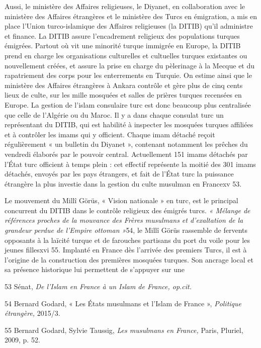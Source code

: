 Aussi, le ministère des Affaires religieuses, le Diyanet, en
collaboration avec le ministère des Affaires étrangères et le ministère
des Turcs en émigration, a mis en place l'Union turco-islamique des
Affaires religieuses (la DITIB) qu'il administre et finance. La DITIB
assure l'encadrement religieux des populations turques émigrées. Partout
où vit une minorité turque immigrée en Europe, la DITIB prend en charge
les organisations culturelles et cultuelles turques existantes ou
nouvellement créées, et assure la prise en charge du pèlerinage à la
Mecque et du rapatriement des corps pour les enterrements en Turquie. On
estime ainsi que le ministère des Affaires étrangères à Ankara contrôle
et gère plus de cinq cents lieux de culte, sur les mille mosquées et
salles de prières turques recensées en Europe. La gestion de l'islam
consulaire turc est donc beaucoup plus centralisée que celle de
l'Algérie ou du Maroc. Il y a dans chaque consulat turc un représentant
du DITIB, qui est habilité à inspecter les mosquées turques affiliées et
à contrôler les imams qui y officient. Chaque imam détaché reçoit
régulièrement « un bulletin du Diyanet », contenant notamment les
prêches du vendredi élaborés par le pouvoir central. Actuellement 151
imams détachés par l'État turc officient à temps plein : cet effectif
représente la moitié des 301 imams détachés, envoyés par les pays
étrangers, et fait de l'État turc la puissance étrangère la plus
investie dans la gestion du culte musulman en Francexv 53.

Le mouvement du Millî Görüs, « Vision nationale » en turc, est le
principal concurrent du DITIB dans le contrôle religieux des émigrés
turcs. \emph{« Mélange de références proches de la mouvance des Frères
musulmans et d'exaltation de la grandeur perdue de l'Empire ottoman
»}54, le Millî Görüs rassemble de fervents opposants à la laïcité turque
et de farouches partisans du port du voile pour les jeunes fillesxvi 55.
Implanté en France dès l'arrivée des premiers Turcs, il est à l'origine
de la construction des premières mosquées turques. Son ancrage local et
sa présence historique lui permettent de s'appuyer sur une

53 Sénat, \emph{De l'Islam en France à un Islam de France, op.cit.}

54 Bernard Godard, « Les États musulmans et l'Islam de France »,
\emph{Politique étrangère,} 2015/3.

55 Bernard Godard, Sylvie Taussig, \emph{Les musulmans en France,}
Paris, Pluriel, 2009, p. 52.




